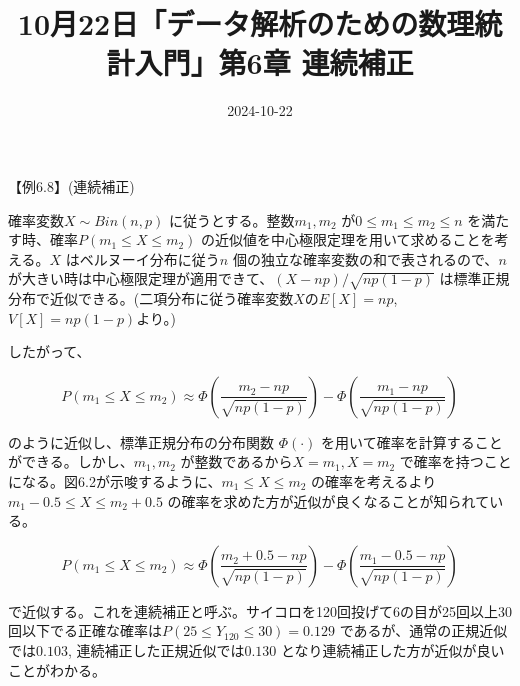 \documentclass[
  letterpaper,
  DIV=11,
  numbers=noendperiod,
  oneside]{scrartcl}
\title{10月22日「データ解析のための数理統計入門」第6章 連続補正}
\author{}
\date{2024-10-22}
\renewcommand*\contentsname{目次}
\newcommand\contentsname{目次}
\begin{document}
\maketitle

\renewcommand*\contentsname{目次}
{
\hypersetup{linkcolor=}
\setcounter{tocdepth}{3}
\tableofcontents
}

【例6.8】(連続補正)

確率変数\(X \sim Bin(n,p)\) に従うとする。整数\(m_1,m_2\)
が\(0 \leq m_1 \leq m_2 \leq n\)
を満たす時、確率\(P(m_1 \leq X \leq m_2 )\)
の近似値を中心極限定理を用いて求めることを考える。\(X\)
はベルヌーイ分布に従う\(n\) 個の独立な確率変数の和で表されるので、\(n\)
が大きい時は中心極限定理が適用できて、\((X-np)/\sqrt{np(1-p)}\)
は標準正規分布で近似できる。(二項分布に従う確率変数\(X\)の\(E[X]=np\),\(V[X]=np(1-p)\)より。)

したがって、

\[
P(m_1 \leq X \leq m_2 ) \approx \Phi(\frac{m_2-np}{\sqrt{np(1-p)}})-\Phi(\frac{m_1-np}{\sqrt{np(1-p)}})
\]

のように近似し、標準正規分布の分布関数 \(\Phi(\cdot)\)
を用いて確率を計算することができる。しかし、\(m_1,m_2\)
が整数であるから\(X=m_1,X=m_2\)
で確率を持つことになる。図6.2が示唆するように、\(m_1 \leq X \leq m_2\)
の確率を考えるより\(m_1-0.5 \leq X \leq m_2+0.5\)
の確率を求めた方が近似が良くなることが知られている。

\[
P(m_1 \leq X \leq m_2 ) \approx \Phi(\frac{m_2+0.5-np}{\sqrt{np(1-p)}})-\Phi(\frac{m_1-0.5-np}{\sqrt{np(1-p)}})
\]

で近似する。これを連続補正と呼ぶ。サイコロを120回投げて6の目が25回以上30回以下でる正確な確率は\(P(25 \leq Y_{120} \leq 30)=0.129\)
であるが、通常の正規近似では\(0.103\), 連続補正した正規近似では\(0.130\)
となり連続補正した方が近似が良いことがわかる。
\end{document}
